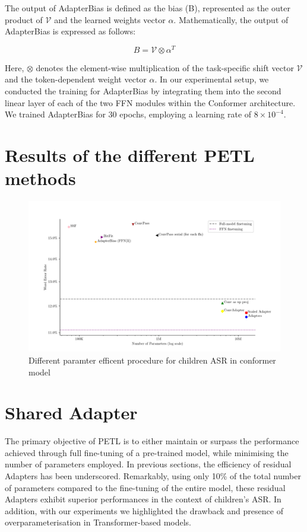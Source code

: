 The output of AdapterBias is defined as the bias (B), represented as the outer product of $\mathcal{V}$ and the learned weights vector $\alpha$. Mathematically, the output of AdapterBias is expressed as follows:

\begin{equation}
    B = \mathcal{V} \otimes \alpha^T    
\end{equation}

Here, \(\otimes\) denotes the element-wise multiplication of the task-specific shift vector \(\mathcal{V}\) and the token-dependent weight vector \(\alpha\).
In our experimental setup, we conducted the training for AdapterBias by integrating them into the second linear layer of each of the two FFN modules within the Conformer architecture. We trained AdapterBias for 30 epochs, employing a learning rate of $8 \times 10^{-4}$.

\section{Results of the different PETL methods}

\begin{figure}
    \begin{center}
        \includegraphics[width=\textwidth]{imgs/Adapter_compare_withoutWide.png}
        \caption{Different paramter efficent procedure for children ASR in conformer model}
        \label{fig:adapter_compared_withoutWide}
    \end{center}
\end{figure}




\section{Shared Adapter}
The primary objective of PETL is to either maintain or surpass the performance achieved through full fine-tuning of a pre-trained model, while minimising the number of parameters employed. In previous sections, the efficiency of residual Adapters has been underscored. Remarkably, using only 10\% of the total number of parameters compared to the fine-tuning of the entire model, these residual Adapters exhibit superior performances in the context of children's ASR. In addition, with our experiments we highlighted the drawback and presence of overparameterisation in Transformer-based models.

